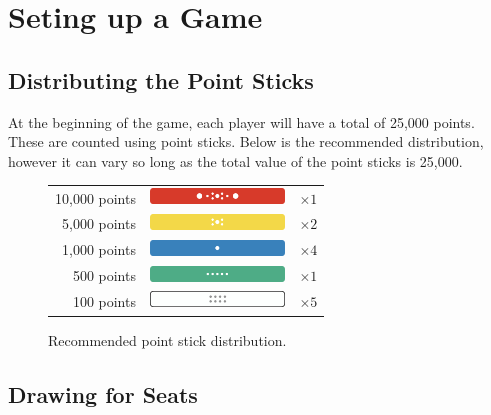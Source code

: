 \section{Seting up a Game}\label{core:sec:hanchan}

\subsection{Distributing the Point Sticks}\label{core:ssec:distribute-sticks}

At the beginning of the game, each player will have a total of 25,000 points. These are counted using point sticks. Below is the recommended distribution, however it can vary so long as the total value of the point sticks is 25,000.

\begin{figure}[h]
	\centering
	\begin{tabular}{rcl}
		10,000 points & \includegraphics[height=12pt]{Resources/Tenbou/10000.png} & \(\times 1\) \\
		5,000 points & \includegraphics[height=12pt]{Resources/Tenbou/5000.png} & \(\times 2\)  \\
		1,000 points & \includegraphics[height=12pt]{Resources/Tenbou/1000.png} & \(\times 4\)  \\
		500 points & \includegraphics[height=12pt]{Resources/Tenbou/500.png} & \(\times 1\)  \\
		100 points & \includegraphics[height=12pt]{Resources/Tenbou/100.png} & \(\times 5\)  \\
	\end{tabular}
	\caption{Recommended point stick distribution.}\label{core:fig:sticks}
\end{figure}

\subsection{Drawing for Seats}\label{core:ssec:seat-draw}

